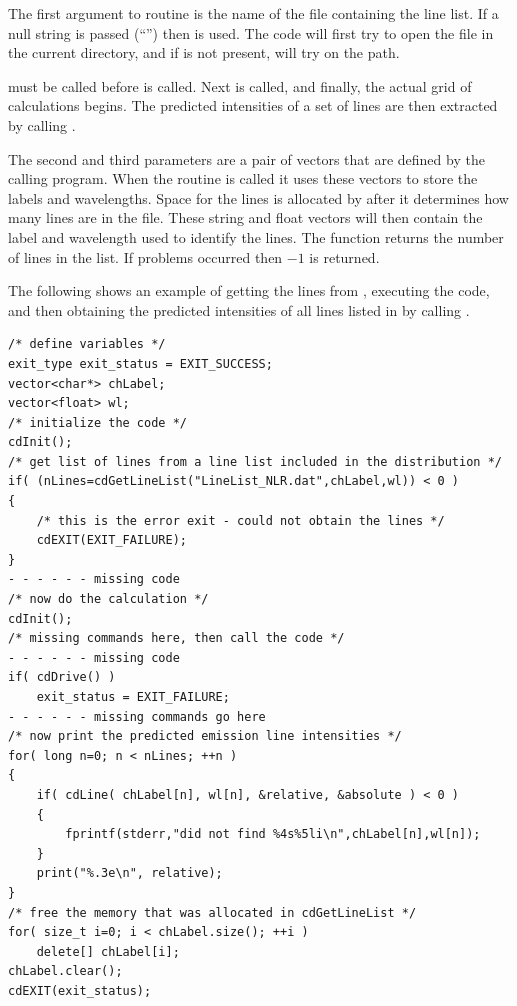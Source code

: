The first argument to routine  is the name of the file
containing the line list.  If a null string is passed (``'') then
 is used.  The code will first try to open the file in the
current directory, and if is not present, will try on the path.

 must be called before  is called.
Next 
is called, and finally, the actual grid of calculations begins.  The
predicted intensities of a set of lines are then extracted by calling
.

The second and third parameters are a pair of vectors that are defined
by the calling program.
When the routine  is called it uses these
vectors to store the labels and wavelengths.
Space for the lines is allocated by  after it determines how
many lines are in the file.  These string and float vectors will then contain
the label and wavelength used to identify the lines.  The function returns
the number of lines in the list.  If problems occurred then $-1$ is returned.

The following shows an example of getting the lines from
,
executing the code, and then obtaining the predicted intensities of all
lines listed in 
by calling .
\begin{verbatim}
/* define variables */
exit_type exit_status = EXIT_SUCCESS;
vector<char*> chLabel;
vector<float> wl;
/* initialize the code */
cdInit();
/* get list of lines from a line list included in the distribution */
if( (nLines=cdGetLineList("LineList_NLR.dat",chLabel,wl)) < 0 )
{
    /* this is the error exit - could not obtain the lines */
    cdEXIT(EXIT_FAILURE);
}
- - - - - - missing code
/* now do the calculation */
cdInit();
/* missing commands here, then call the code */
- - - - - - missing code
if( cdDrive() )
    exit_status = EXIT_FAILURE;
- - - - - - missing commands go here
/* now print the predicted emission line intensities */
for( long n=0; n < nLines; ++n )
{
    if( cdLine( chLabel[n], wl[n], &relative, &absolute ) < 0 )
    {
        fprintf(stderr,"did not find %4s%5li\n",chLabel[n],wl[n]);
    }
    print("%.3e\n", relative);
}
/* free the memory that was allocated in cdGetLineList */
for( size_t i=0; i < chLabel.size(); ++i )
    delete[] chLabel[i];
chLabel.clear();
cdEXIT(exit_status);
\end{verbatim}

